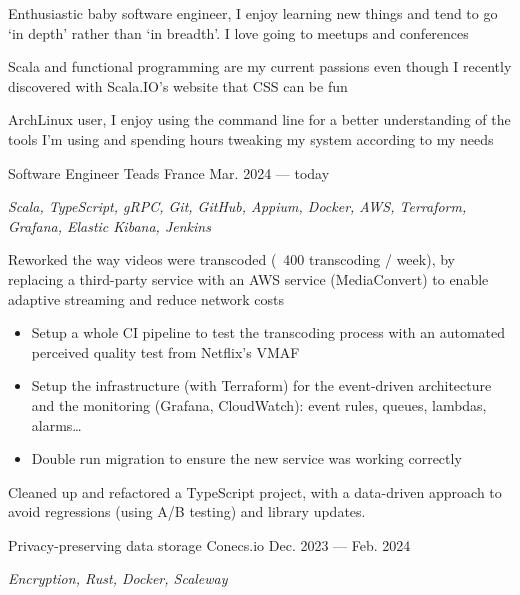 \begin{MainPart}
  \color{Black}
  \vspace{0.25cm}
  {
    \vspace{-\baselineskip}
    \begin{flushleft}
      Enthusiastic baby software engineer, I enjoy learning new things and tend to go `in depth' rather than `in breadth'. I love going to meetups and conferences

      \vspace{0.5\baselineskip}
      Scala and functional programming are my current passions even though I recently discovered with Scala.IO's website that CSS can be fun

      \vspace{0.5\baselineskip}
      ArchLinux user, I enjoy using the command line for a better understanding of the tools I'm using and spending hours tweaking my system according to my needs
    \end{flushleft}
  }

  \Experience%
  {Software Engineer}
  {Teads France}
  {Mar. 2024 --- today}
  {
    \textit{Scala, TypeScript, gRPC, Git, GitHub, Appium, Docker, AWS, Terraform, Grafana, Elastic Kibana, Jenkins}

    \begin{ItemList}{\ColorHighlight}
      \item[\ding{226}] Reworked the way videos were transcoded (~400 transcoding / week), by replacing a third-party service with an AWS service (MediaConvert) to enable adaptive streaming and reduce network costs
      \begin{itemize}
        \item Setup a whole CI pipeline to test the transcoding process with an automated perceived quality test from Netflix's VMAF
        \item Setup the infrastructure (with Terraform) for the event-driven architecture and the monitoring (Grafana, CloudWatch): event rules, queues, lambdas, alarms\dots
        \item Double run migration to ensure the new service was working correctly
      \end{itemize}
      \item[\ding{226}] Cleaned up and refactored a TypeScript project, with a data-driven approach to avoid regressions (using A/B testing) and library updates.
    \end{ItemList}
  }
  \Experience%
  {Privacy-preserving data storage}
  {Conecs.io}
  {Dec. 2023 --- Feb. 2024}
  {
    \textit{Encryption, Rust, Docker, Scaleway}

}
\end{MainPart}
